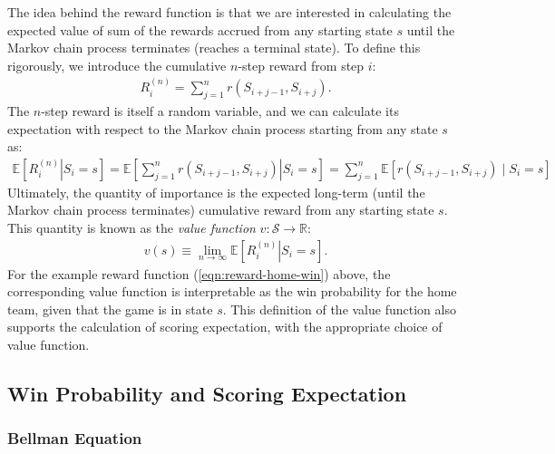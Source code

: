 \documentclass{article}
\begin{document}
      The idea behind the reward function is that we are interested in calculating the expected value of sum of the rewards accrued from any starting state $s$ until the Markov chain process terminates (reaches a terminal state). To define this rigorously, we introduce the cumulative $n$-step reward from step $i$:
      \begin{align*}
        R_i^{(n)} = \sum_{j=1}^n r(S_{i + j - 1}, S_{i + j}).
      \end{align*}
      The $n$-step reward is itself a random variable, and we can calculate its expectation with respect to the Markov chain process starting from any state $s$ as:
      \begin{align*}
        \mathbb{E}\left[\left.R_i^{(n)} \right| S_i = s\right] =       \mathbb{E}\left[\left.\sum_{j=1}^n r(S_{i + j - 1}, S_{i + j}) \right| S_i = s\right] = \sum_{j=1}^n \mathbb{E}[r(S_{i + j - 1}, S_{i + j}) \mid S_i = s]
      \end{align*}
      Ultimately, the quantity of importance is the expected long-term (until the Markov chain process terminates) cumulative reward from any starting state $s$. This quantity is known as the {\it value function} $v : \mathcal S \rightarrow \mathbb{R}$:
      \begin{align}
        \label{eqn:value-function}
        v(s) \equiv \lim_{n\rightarrow\infty}\mathbb{E}\left[\left.R_i^{(n)} \right| S_i = s\right].
      \end{align}
      For the example reward function (\ref{eqn:reward-home-win}) above, the corresponding value function is interpretable as the win probability for the home team, given that the game is in state $s$. This definition of the value function also supports the calculation of scoring expectation, with the appropriate choice of value function.

  \subsection{\sc Win Probability and Scoring Expectation}

    \subsubsection{\sc Bellman Equation}
\end{document}
